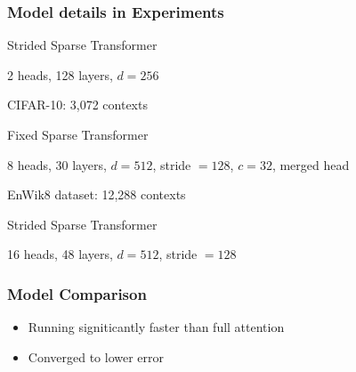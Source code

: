 \documentclass[dvipdfmx]{beamer}
\begin{document}
\begin{frame}[noframenumbering]
    \frametitle{Model details in Experiments}
    \begin{yitemize}
        \item Strided Sparse Transformer
        \begin{yitemize}
            \item 2 heads, 128 layers, $d = 256$
        \end{yitemize}
        \item CIFAR-10: 3,072 contexts
    \end{yitemize}
    \begin{yitemize}
        \item Fixed Sparse Transformer
        \begin{yitemize}
            \item 8 heads, 30 layers, $d = 512$, stride $= 128$, $c = 32$, merged head
        \end{yitemize}
        \item EnWik8 dataset: 12,288 contexts
    \end{yitemize}
    \begin{yitemize}
        \item Strided Sparse Transformer
        \begin{yitemize}
            \item 16 heads, 48 layers, $d = 512$, stride $= 128$
        \end{yitemize}
    \end{yitemize}
\end{frame}


\begin{frame}[noframenumbering]
    \frametitle{Model Comparison}
    \begin{itemize}
        \item Running signiticantly faster than full attention
        \item Converged to lower error
    \end{itemize}
\end{frame}
\end{document}
